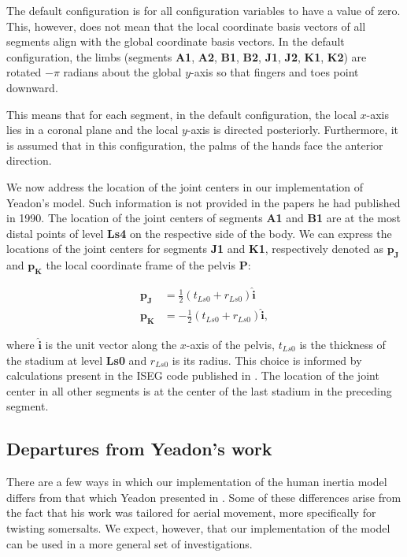 \documentclass[10pt]{article}
\begin{document}
The default configuration is for all configuration variables to have a value of
zero. This, however, does not mean that the local coordinate basis vectors of
all segments align with the global coordinate basis vectors. In the default
configuration, the limbs (segments \textbf{A1}, \textbf{A2}, \textbf{B1},
\textbf{B2}, \textbf{J1}, \textbf{J2}, \textbf{K1}, \textbf{K2}) are rotated
$-\pi$ radians about the global $y$-axis
so that fingers and toes point downward.

This means that for each segment, in the default configuration, the local
$x$-axis lies in a coronal plane and the local $y$-axis is directed
posteriorly. Furthermore, it is assumed that in this configuration, the palms
of the hands face the anterior direction.

We now address the location of the joint centers in our implementation of
Yeadon's model. Such information is not provided in the papers he had published
in 1990. The location of the joint centers of segments \textbf{A1} and
\textbf{B1} are at the most distal points of level \textbf{Ls4} on the
respective side of the body. We can express the locations of the joint centers
for segments \textbf{J1} and \textbf{K1}, respectively denoted as
$\mathbf{p_J}$ and $\mathbf{p_K}$ the local coordinate frame of the pelvis
\textbf{P}:

\begin{align}
    \mathbf{p_J} &= \frac{1}{2} (t_{Ls0} + r_{Ls0})\mathbf{\hat{i}} \\
    \mathbf{p_K} &= -\frac{1}{2} (t_{Ls0} + r_{Ls0})\mathbf{\hat{i}},
\end{align}

where $\mathbf{\hat{i}}$ is the unit vector along the $x$-axis of the pelvis,
$t_{Ls0}$ is the thickness of the stadium at level \textbf{Ls0} and $r_{Ls0}$
is its radius. This choice is informed by calculations present in the ISEG code
published in \cite{Yeadon1984a}. The location of the joint center in all other
segments is at the center of the last stadium in the preceding segment.

\subsection*{Departures from Yeadon's work}

There are a few ways in which our implementation of the human inertia model
differs from that which Yeadon presented in \cite{Yeadon1990c, Yeadon1990f,
Yeadon1990e, Yeadon1990d}. Some of these differences arise from the fact that
his work was tailored for aerial movement, more specifically for twisting
somersalts. We expect, however, that our implementation of the model can be
used in a more general set of investigations.
\end{document}
